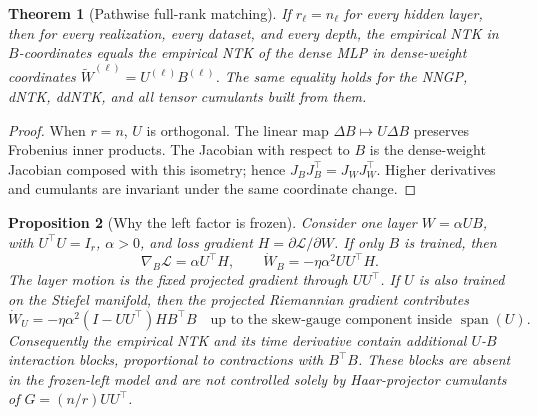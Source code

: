 \documentclass{article}
\newtheorem{theorem}{Theorem}[section]
\newtheorem{proposition}[theorem]{Proposition}
\newcommand{\wt}{\widetilde}
\begin{document}
\begin{theorem}[Pathwise full-rank matching]
\label{thm:pathwise}
If \(r_\ell=n_\ell\) for every hidden layer, then for every realization, every dataset, and every depth, the empirical NTK in \(B\)-coordinates equals the empirical NTK of the dense MLP in dense-weight coordinates \(\wt W^{(\ell)}=U^{(\ell)}B^{(\ell)}\). The same equality holds for the NNGP, dNTK, ddNTK, and all tensor cumulants built from them.
\end{theorem}

\begin{proof}
When \(r=n\), \(U\) is orthogonal. The linear map \(\Delta B\mapsto U\Delta B\) preserves Frobenius inner products. The Jacobian with respect to \(B\) is the dense-weight Jacobian composed with this isometry; hence \(J_BJ_B^\top=J_WJ_W^\top\). Higher derivatives and cumulants are invariant under the same coordinate change.
\end{proof}

\begin{proposition}[Why the left factor is frozen]
\label{prop:frozen-left}
Consider one layer \(W=\alpha UB\), with \(U^\top U=I_r\), \(\alpha>0\), and loss gradient \(H=\partial \mathcal L/\partial W\). If only \(B\) is trained, then
\begin{equation}
\nabla_B\mathcal L=\alpha U^\top H,
\qquad
\dot W_B=-\eta\alpha^2UU^\top H.
\label{eq:frozen-left-flow}
\end{equation}
The layer motion is the fixed projected gradient through \(UU^\top\). If \(U\) is also trained on the Stiefel manifold, then the projected Riemannian gradient contributes
\begin{equation}
\dot W_U
=-\eta\alpha^2 (I-UU^\top)H B^\top B
\quad
\text{up to the skew-gauge component inside } \operatorname{span}(U).
\label{eq:moving-left-flow}
\end{equation}
Consequently the empirical NTK and its time derivative contain additional \(U\)-\(B\) interaction blocks, proportional to contractions with \(B^\top B\). These blocks are absent in the frozen-left model and are not controlled solely by Haar-projector cumulants of \(G=(n/r)UU^\top\).
\end{proposition}
\end{document}
